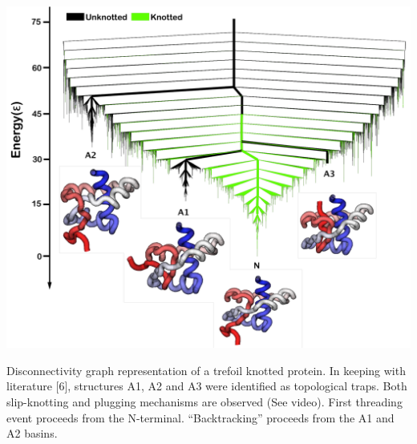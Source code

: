 \documentclass[a0paper,portrait]{baposter}
\begin{document}
\begin{poster}
{\begin{center}
\includegraphics[width=0.7\linewidth]{MJ0366.pdf} 
\end{center}
\vspace{-0.5cm}
Disconnectivity graph representation of a trefoil knotted protein. In keeping with literature [6], structures A1, A2 and A3 were identified as topological traps. Both slip-knotting and plugging mechanisms are observed (See video). First threading event proceeds from the N-terminal. ``Backtracking'' proceeds from the A1 and A2  basins. 
}


\end{poster}
\end{document}
